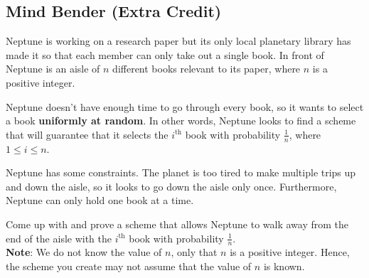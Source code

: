 \documentclass[12pt,letterpaper]{article}
\newcommand\note[1]{\textbf{Note}: #1}
\newcounter{enum22i}
\begin{document}
\subsection*{Mind Bender (Extra Credit)}
{

{\setcounter{enum22i}{0}

      Neptune is working on a research paper but its only local planetary library has made it so that each member can only take out a single book. In front of Neptune is an aisle of $n$ different books relevant to its paper, where $n$ is a positive integer.

      Neptune doesn't have enough time to go through every book, so it wants to select a book \textbf{uniformly at random}. In other words, Neptune looks to find a scheme that will guarantee that it selects the $i^{\text{th}}$ book with probability $\frac{1}{n}$, where $1 \leq i \leq n$.
      
      Neptune has some constraints. The planet is too tired to make multiple trips up and down the aisle, so it looks to go down the aisle only once. Furthermore, Neptune can only hold one book at a time.
      
      Come up with and prove a scheme that allows Neptune to walk away from the end of the aisle with the $i^{\text{th}}$ book with probability $\frac{1}{n}$.\\
      
      \note{We do not know the value of $n$, only that $n$ is a positive integer. Hence, the scheme you create may not assume that the value of $n$ is known.}
      
}
}

  
\end{document}

